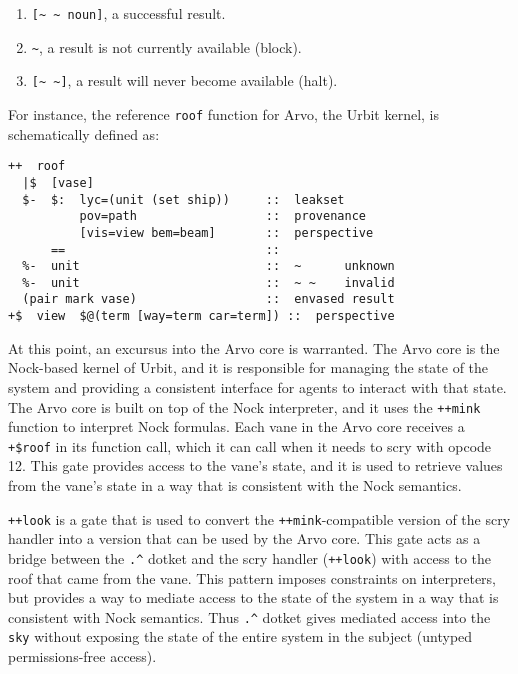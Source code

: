 \documentclass[twoside]{article}
\begin{document}
\begin{enumerate}
  \item  \lstinline[style=inlinecode]{[~ ~ noun]}, a successful result.
  \item  \lstinline[style=inlinecode]{~}, a result is not currently available (block).
  \item  \lstinline[style=inlinecode]{[~ ~]}, a result will never become available (halt).
\end{enumerate}

For instance, the reference \texttt{roof} function for Arvo, the Urbit kernel, is schematically defined as:

\begin{lstlisting}[style=listingcode]
++  roof
  |$  [vase]
  $-  $:  lyc=(unit (set ship))     ::  leakset
          pov=path                  ::  provenance
          [vis=view bem=beam]       ::  perspective
      ==                            ::
  %-  unit                          ::  ~      unknown
  %-  unit                          ::  ~ ~    invalid
  (pair mark vase)                  ::  envased result
+$  view  $@(term [way=term car=term]) ::  perspective
\end{lstlisting}

At this point, an excursus into the Arvo core is warranted.  The Arvo core is the Nock-based kernel of Urbit, and it is responsible for managing the state of the system and providing a consistent interface for agents to interact with that state.  The Arvo core is built on top of the Nock interpreter, and it uses the \lstinline[style=inlinecode]{++mink} function to interpret Nock formulas.  Each vane in the Arvo core receives a \lstinline[style=inlinecode]{+$roof} in its function call, which it can call when it needs to scry with opcode 12.  This gate provides access to the vane's state, and it is used to retrieve values from the vane's state in a way that is consistent with the Nock semantics.

\lstinline[style=inlinecode]{++look} is a gate that is used to convert the \lstinline[style=inlinecode]{++mink}-compa\-tible version of the scry handler into a version that can be used by the Arvo core.  This gate acts as a bridge between the \lstinline[style=inlinecode]{.^} dotket and the scry handler (\lstinline[style=inlinecode]{++look}) with access to the roof that came from the vane.  This pattern imposes constraints on interpreters, but provides a way to mediate access to the state of the system in a way that is consistent with Nock semantics.   Thus \lstinline[style=inlinecode]{.^} dotket gives mediated access into the \lstinline[style=inlinecode]{sky} without exposing the state of the entire system in the subject (untyped permissions-free access).
\end{document}
